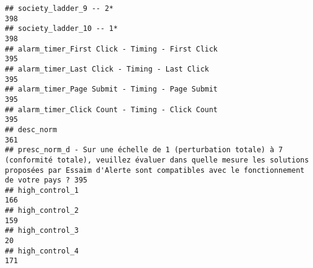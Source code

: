 \documentclass[
]{article}
\begin{document}
\begin{verbatim}
## society_ladder_9 -- 2*                                                                                                                                                                                                     398
## society_ladder_10 -- 1*                                                                                                                                                                                                    398
## alarm_timer_First Click - Timing - First Click                                                                                                                                                                             395
## alarm_timer_Last Click - Timing - Last Click                                                                                                                                                                               395
## alarm_timer_Page Submit - Timing - Page Submit                                                                                                                                                                             395
## alarm_timer_Click Count - Timing - Click Count                                                                                                                                                                             395
## desc_norm                                                                                                                                                                                                                  361
## presc_norm_d - Sur une échelle de 1 (perturbation totale) à 7 (conformité totale), veuillez évaluer dans quelle mesure les solutions proposées par Essaim d'Alerte sont compatibles avec le fonctionnement de votre pays ? 395
## high_control_1                                                                                                                                                                                                             166
## high_control_2                                                                                                                                                                                                             159
## high_control_3                                                                                                                                                                                                              20
## high_control_4                                                                                                                                                                                                             171

\end{verbatim}
\end{document}
